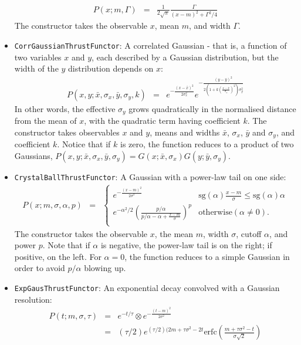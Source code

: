 \documentclass[12pt,pdflatex]{article}
\begin{document}
\begin{itemize}
\begin{eqnarray}
P(x;m,\Gamma) &=& \frac{1}{2\sqrt{\pi}}\frac{\Gamma}{(x-m)^2 + \Gamma^2/4}
\end{eqnarray}
The constructor takes the observable $x$, mean $m$, and width $\Gamma$. 
\item \texttt{CorrGaussianThrustFunctor}: A correlated Gaussian - that is, 
a function of two variables $x$ and $y$, each described by a Gaussian distribution, 
but the width of the $y$ distribution depends on $x$:
\begin{eqnarray}
P(x,y;\bar x,\sigma_x,\bar y, \sigma_y, k) &=& 
e^{-\frac{(x-\bar x)^2}{2\sigma_x^2}}e^{-\frac{(y-\bar y)^2}{2(1 + k(\frac{x-\bar x}{\sigma_x})^2)\sigma_y^2}}
\end{eqnarray}
In other words, the effective $\sigma_y$ grows quadratically
in the normalised distance from the mean of $x$, with the quadratic
term having coefficient $k$.
The constructor takes observables $x$ and $y$, means and widths $\bar x$, $\sigma_x$,
$\bar y$ and $\sigma_y$, and coefficient $k$. Notice that if $k$ is zero, 
the function reduces to a product of two Gaussians, 
$P(x,y;\bar x,\sigma_x,\bar y, \sigma_y) = G(x;\bar x, \sigma_x)G(y;\bar y, \sigma_y)$. 
\item \texttt{CrystalBallThrustFunctor}: A Gaussian with a power-law tail on one side:
\begin{eqnarray}
P(x;m,\sigma,\alpha,p) &=& \left\{ \begin{matrix}
e^{-\frac{(x-m)^2}{2\sigma^2}} & \mathrm{sg}(\alpha)\frac{x - m}{\sigma} \le \mathrm{sg}(\alpha)\alpha \\
e^{-\alpha^2/2}\left(\frac{p/\alpha}{p/\alpha - \alpha + \frac{x-m}{\sigma}}\right)^p
& \mathrm{otherwise } (\alpha\ne 0). \\
\end{matrix}
\right. 
\end{eqnarray}
The constructor takes the observable $x$, the mean $m$, width $\sigma$, cutoff $\alpha$,
and power $p$. Note that if $\alpha$ is negative, the power-law tail is on the right;
if positive, on the left. For $\alpha=0$, the function reduces to a simple Gaussian
in order to avoid $p/\alpha$ blowing up. 
\item \texttt{ExpGausThrustFunctor}: An exponential decay convolved with a Gaussian
resolution:
\begin{eqnarray}
P(t;m,\sigma,\tau) &=& e^{-t/\tau} \otimes e^{-\frac{(t-m)^2}{2\sigma^2}} \\
&=& (\tau/2)e^{(\tau/2)(2m+\tau\sigma^2-2t}\mathrm{erfc}\left(\frac{m+\tau\sigma^2-t}{\sigma\sqrt{2}}\right)

\end{eqnarray}
\end{itemize}
\end{document}
